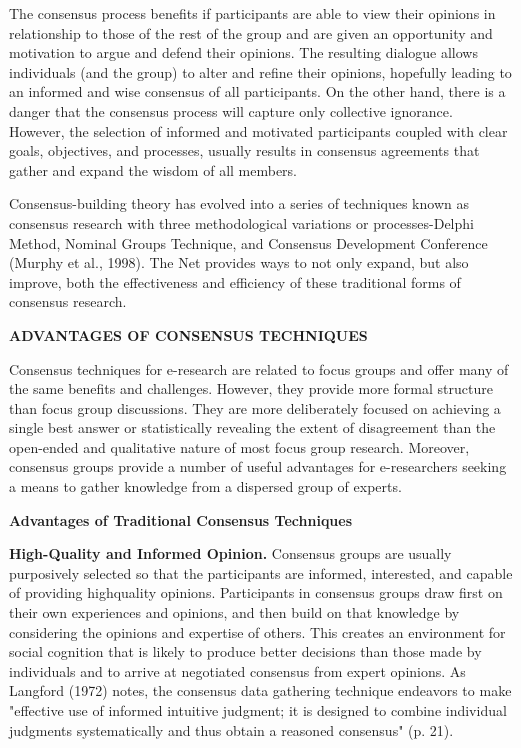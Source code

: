 \documentclass[a4]{article}
\begin{document}
The consensus process benefits if participants are able to view their opinions in relationship to those of the rest of the group and are given an opportunity and motivation to argue and defend their opinions. The resulting dialogue allows individuals (and the group) to alter and refine their opinions, hopefully leading to an informed and wise consensus of all participants. On the other hand, there is a danger that the consensus process will capture only collective ignorance. However, the selection of informed and motivated participants coupled with clear goals, objectives, and processes, usually results in consensus agreements that gather and expand the wisdom of all members.

Consensus-building theory has evolved into a series of techniques known as consensus research with three methodological variations or processes-Delphi Method, Nominal Groups Technique, and Consensus Development Conference (Murphy et al., 1998). The Net provides ways to not only expand, but also improve, both the effectiveness and efficiency of these traditional forms of consensus research.

\vspace{0.5cm}
{\large\textbf{ADVANTAGES OF CONSENSUS TECHNIQUES}}
\vspace{0.5cm}

Consensus techniques for e-research are related to focus groups and offer many of the same benefits and challenges. However, they provide more formal structure than focus group discussions. They are more deliberately focused on achieving a single best answer or statistically revealing the extent of disagreement than the open-ended and qualitative nature of most focus group research. Moreover, consensus groups provide a number of useful advantages for e-researchers seeking a means to gather knowledge from a dispersed group of experts.

\vspace{0.5cm}
{\large\textbf{Advantages of Traditional Consensus Techniques}}
\vspace{0.5cm}

\textbf{High-Quality and Informed Opinion.} Consensus groups are usually purposively selected so that the participants are informed, interested, and capable of providing highquality opinions. Participants in consensus groups draw first on their own experiences
and opinions, and then build on that knowledge by considering the opinions and expertise of others. This creates an environment for social cognition that is likely to produce better decisions than those made by individuals and to arrive at negotiated consensus from expert opinions. As Langford (1972) notes, the consensus data gathering technique endeavors to make "effective use of informed intuitive judgment; it is designed to combine individual judgments systematically and thus obtain a reasoned consensus" (p. 21).
\end{document}
